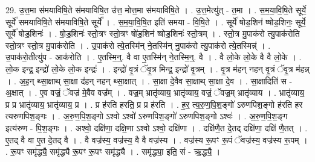 \documentclass[17pt]{extarticle}
\begin{document}
29. उ॒त्त॒मा स॑मयाविषि॒ते स॑मयाविषि॒त उ॑त्त॒ मोत्त॒मा स॑मयाविषि॒ते । . उ॒त्त॒मेत्यु॑त् - त॒मा । . स॒म॒या॒वि॒षि॒ते सूर्ये॒ सूर्ये॑ समयाविषि॒ते स॑मयाविषि॒ते सूर्ये᳚ । . स॒म॒या॒वि॒षि॒त इति॑ समया - वि॒षि॒ते । . सूर्ये॑ षोड॒शिन॑ ष्षोड॒शिनः॒ सूर्ये॒ सूर्ये॑ षोड॒शिनः॑ । . षो॒ड॒शिनः॑ स्तो॒त्रꣳ स्तो॒त्रꣳ षो॑ड॒शिन॑ ष्षोड॒शिनः॑ स्तो॒त्रम् । . स्तो॒त्र मु॒पाक॑रो त्यु॒पाक॑रोति स्तो॒त्रꣳ स्तो॒त्र मु॒पाक॑रोति । . उ॒पाक॑रो त्ये॒तस्मि॑न् ने॒तस्मि॑न् नु॒पाक॑रो त्यु॒पाक॑रो त्ये॒तस्मिन्न्॑ । . उ॒पाक॑रो॒तीत्यु॑प - आक॑रोति । . ए॒तस्मि॒न्॒. वै वा ए॒तस्मि॑न् ने॒तस्मि॒न्॒. वै । . वै लो॒के लो॒के वै वै लो॒के । . लो॒क इन्द्र॒ इन्द्रो॑ लो॒के लो॒क इन्द्रः॑ । . इन्द्रो॑ वृ॒त्रं ॅवृ॒त्र मिन्द्र॒ इन्द्रो॑ वृ॒त्रम् । . वृ॒त्र म॑हन् नहन् वृ॒त्रं ॅवृ॒त्र म॑हन्न् । . अ॒ह॒न् थ्सा॒क्षाथ् सा॒क्षा द॑हन् नहन् थ्सा॒क्षात् । . सा॒क्षा दे॒वैव सा॒क्षाथ् सा॒क्षा दे॒व । . सा॒क्षादिति॑ स - अ॒क्षात् । . ए॒व वज्रं॒ ॅवज्र॑ मे॒वैव वज्र᳚म् । . वज्र॒म् भ्रातृ॑व्याय॒ भ्रातृ॑व्याय॒ वज्रं॒ ॅवज्र॒म् भ्रातृ॑व्याय । . भ्रातृ॑व्याय॒ प्र प्र भ्रातृ॑व्याय॒ भ्रातृ॑व्याय॒ प्र । . प्र ह॑रति हरति॒ प्र प्र ह॑रति । . ह॒र॒ त्य॒रु॒ण॒पि॒श॒ङ्गो॑ ऽरुणपिश॒ङ्गो ह॑रति हर त्यरुणपिश॒ङ्गः । . अ॒रु॒ण॒पि॒श॒ङ्गो ऽश्वो ऽश्वो॑ ऽरुणपिश॒ङ्गो॑ ऽरुणपिश॒ङ्गो ऽश्वः॑ । . अ॒रु॒ण॒पि॒श॒ङ्ग इत्य॑रुण - पि॒श॒ङ्गः । . अश्वो॒ दक्षि॑णा॒ दक्षि॒णा ऽश्वो ऽश्वो॒ दक्षि॑णा । . दक्षि॑णै॒त दे॒तद् दक्षि॑णा॒ दक्षि॑ णै॒तत् । . ए॒तद् वै वा ए॒त दे॒तद् वै । . वै वज्र॑स्य॒ वज्र॑स्य॒ वै वै वज्र॑स्य । . वज्र॑स्य रू॒पꣳ रू॒पं ॅवज्र॑स्य॒ वज्र॑स्य रू॒पम् । . रू॒पꣳ समृ॑द्ध्यै॒ समृ॑द्ध्यै रू॒पꣳ रू॒पꣳ समृ॑द्ध्यै । . समृ॑द्ध्या॒ इति॒ सं - ऋ॒द्ध्यै॒ । \newline
\end{document}
